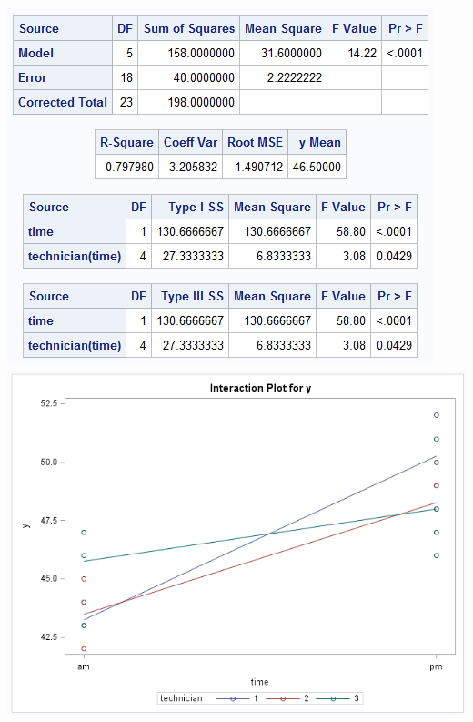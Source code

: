 \begin{center}
\includegraphics[scale=0.65]{NestedSAS1}\\
\includegraphics[scale=0.4]{NestedSAS2}
\end{center}
